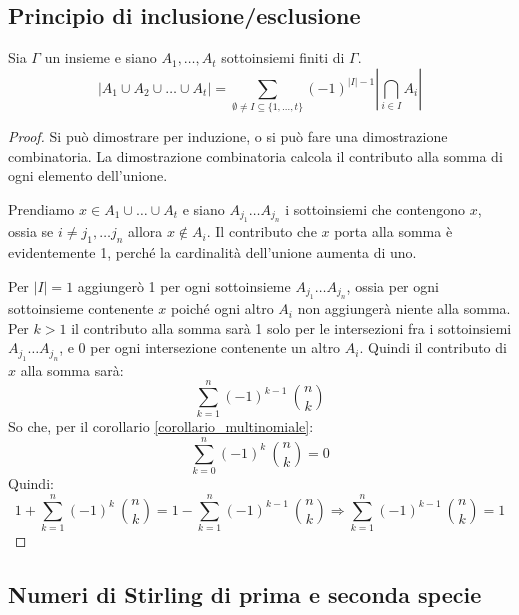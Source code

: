 \subsection{Principio di inclusione/esclusione}

\begin{prop}
Sia $\Gamma$ un insieme e siano $A_1, \dots, A_t$ sottoinsiemi finiti di $\Gamma$.
\begin{equation}
| A_1 \cup A_2 \cup \ldots \cup A_t |  = 
\sum_{\emptyset \neq I \subseteq \{ 1, \ldots, t \}} (-1)^{|I| - 1} \left| \bigcap_{i \in I} A_i \right|
\end{equation}
\end{prop}
\begin{proof}
Si pu\`o dimostrare per induzione, o si pu\`o fare una dimostrazione combinatoria. La dimostrazione combinatoria calcola il contributo alla somma di ogni elemento dell'unione.

Prendiamo $x \in A_1 \cup \dots \cup A_t$ e siano $A_{j_1} \dots A_{j_n}$ i sottoinsiemi che contengono $x$, ossia se $i \neq j_1 , \dots j_n$ allora $x \notin A_i$. Il contributo che $x$ porta alla somma \`e evidentemente 1, perch\'e la cardinalit\`a dell'unione aumenta di uno.

Per $|I| = 1$ aggiunger\`o 1 per ogni sottoinsieme $A_{j_1} \dots A_{j_n}$, ossia per ogni sottoinsieme contenente $x$ poich\'e ogni altro $A_i$ non aggiunger\`a niente alla somma. Per $k > 1$ il contributo alla somma sar\`a 1 solo per le intersezioni fra i sottoinsiemi $A_{j_1} \dots A_{j_n}$, e 0 per ogni intersezione contenente un altro $A_i$. Quindi il contributo di $x$ alla somma sar\`a:
\[
\sum_{k = 1}^{n} (-1)^{k - 1} \ \binom{n}{k}
\]
So che, per il corollario \ref{corollario_multinomiale}:
\[
\sum_{k = 0}^{n} (-1)^k \ \binom{n}{k} = 0
\]
Quindi:
\[
1 + \sum_{k = 1}^{n} (-1)^{k} \ \binom{n}{k} = 
1 - \sum_{k = 1}^{n} (-1)^{k - 1} \ \binom{n}{k} \Rightarrow
\sum_{k = 1}^{n} (-1)^{k - 1} \ \binom{n}{k} = 1
\]
\end{proof}

\subsection{Numeri di Stirling di prima e seconda specie}



